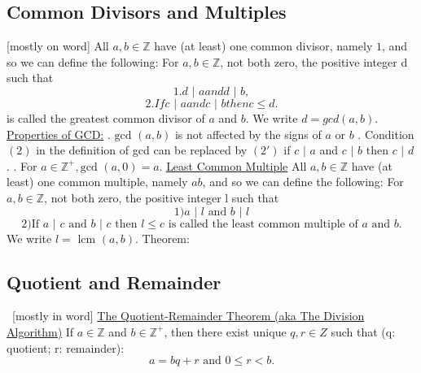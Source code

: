 \documentclass{article}
\begin{document}
\subsection{Common Divisors and Multiples}
[mostly on word]
\newline
All $a,b \in \mathbb{Z}$ have (at least) one common divisor, namely $1$, and so we can define the following:
\newline
For $a,b \in \mathbb{Z}$, not both zero, the positive integer d such that
$$1.	d \text{ | } a and d \text{ | } b,$$
$$2.	If c \text{ | } a and c \text{ | } b then c \le d.$$
is called the greatest common divisor of $a$ and $b$.
We write $d = gcd(a,b)$.
\newline
\newline
{}
\newline
\newline
\underline{ Properties of GCD:}
\newline
{}. $\text{gcd }(a,b)$ is not affected by the signs of $a$ or $b$
. Condition $(2)$ in the definition of gcd can be replaced by $(2')$ if $c \text{ | } a$ and $c \text{ | } b$ then $c \text{ | } d$.
. For $a \in \mathbb{Z}^+, \text{gcd }(a,0) = a$.
\newline
\newline
\underline{Least Common Multiple}
\newline
\newline
All $a,b \in \mathbb{Z}$ have (at least) one common multiple, namely $ab$, and so we can define the following:
For $a,b \in \mathbb{Z}$, not both zero, the positive integer l such that
$$1)	a \text{ | } l \text{ and } b \text{ | } l$$
$$2)	\text{If } a \text{ | } c \text{ and } b \text{ | } c \text{ then } l \le c \text{ is called the least common multiple of } a \text{ and } b.$$ 
\newline
We write $l = \text{ lcm }(a,b)$.
\newline
\newline
Theorem:
\newline
\newline
{}
\newpage
\subsection*{Quotient and Remainder}
\
[mostly in word]
\newline
\newline
\underline{The Quotient-Remainder Theorem (aka The Division Algorithm)}
\newline
\newline
If $a \in \mathbb{Z}$ and $b \in \mathbb{Z}^+$, then there exist unique $q,r \in Z$ such that (q: quotient; r: remainder):
$$a = bq + r	\text{ and }	0 \le r < b.$$
\newline
\newline
{}
\newpage
\end{document}
